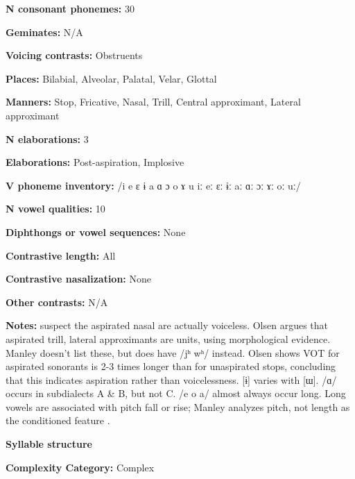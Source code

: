\textbf{N consonant phonemes:} 30



\textbf{Geminates:} N/A



\textbf{Voicing contrasts:} Obstruents



\textbf{Places:} Bilabial, Alveolar, Palatal, Velar, Glottal



\textbf{Manners:} Stop, Fricative, Nasal, Trill, Central approximant, Lateral approximant



\textbf{N elaborations:} 3



\textbf{Elaborations:} Post-aspiration, Implosive



\textbf{V phoneme inventory:} /i e ɛ ɨ a ɑ ɔ o ɤ u iː eː ɛː ɨː aː ɑː ɔː ɤː oː uː/



\textbf{N vowel qualities:} 10



\textbf{Diphthongs or vowel sequences:} None



\textbf{Contrastive length:} All



\textbf{Contrastive nasalization:} None



\textbf{Other contrasts:} N/A



\textbf{Notes:}  \citet[116]{LadefogedMaddieson1996} suspect the aspirated nasal are actually voiceless. Olsen argues that aspirated trill, lateral approximants are units, using morphological evidence. Manley doesn’t list these, but does have /jʰ wʰ/ instead. Olsen shows VOT for aspirated sonorants is 2-3 times longer than for unaspirated stops, concluding that this indicates aspiration rather than voicelessness. [ɨ] varies with [ɯ]. /ɑ/ occurs in subdialects A \& B, but not C. /e o a/ almost always occur long. Long vowels are associated with pitch fall or rise; Manley analyzes pitch, not length as the conditioned feature \citep[15]{Manley1972}.



\textbf{Syllable structure}



\textbf{Complexity Category:} Complex



